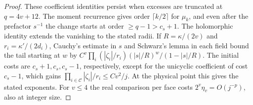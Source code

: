 \begin{proof}
These coefficient identities persist when excesses are truncated at \(q=4v+12\). The moment recurrence
gives order \(\lceil k/2\rceil\) for \(\mu_k\), and even after the prefactor \(s^{-1}\) the change starts
at order \(\ge q-1>c_s+1\). The holomorphic identity extends the vanishing to the stated radii. If
\(R=\kappa/(2v)\) and \(r_i=\kappa'/(2d_i)\), Cauchy's estimate in \(s\) and Schwarz's lemma in each
field bound the tail starting at \(w\) by \(C^v\prod_i(|\zeta_i|/r_i)(|s|/R)^w/(1-|s|/R)\). The initial
costs are \(c_s+1,c_s,c_s-1\), respectively, except for the unicyclic coefficient of cost \(c_s-1\),
which gains \(\prod_{i\in\mathcal C}|\zeta_i|/r_i
\le Cv^2/j\). At the physical point this gives the stated exponents. For \(v\le4\) the real comparison
per face costs \(2^v\eta_v=O(j^{-p})\), also at integer size.
\end{proof}
